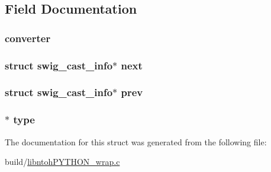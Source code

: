 \subsection{Field Documentation}
\hypertarget{structswig__cast__info_ab0c02ae209c86c1a920b1a6cbec7ec52}{
\subsubsection[{converter}]{ converter}}\label{structswig__cast__info_ab0c02ae209c86c1a920b1a6cbec7ec52}
\hypertarget{structswig__cast__info_af4349454713002040fd3799016337b36}{
\subsubsection[{next}]{\setlength{\rightskip}{0pt plus 5cm}struct {\bf swig\-\_\-cast\-\_\-info}$\ast$ next}}\label{structswig__cast__info_af4349454713002040fd3799016337b36}
\hypertarget{structswig__cast__info_ad21cc20a49152bc851275a6747e89493}{
\subsubsection[{prev}]{\setlength{\rightskip}{0pt plus 5cm}struct {\bf swig\-\_\-cast\-\_\-info}$\ast$ prev}}\label{structswig__cast__info_ad21cc20a49152bc851275a6747e89493}
\hypertarget{structswig__cast__info_aa19bc251346ad9ae4ecb3b4e34545a5d}{
\subsubsection[{type}]{$\ast$ type}}\label{structswig__cast__info_aa19bc251346ad9ae4ecb3b4e34545a5d}


The documentation for this struct was generated from the following file\-:\begin{DoxyCompactItemize}
\item 
build/\hyperlink{libntoh_p_y_t_h_o_n__wrap_8c}{libntoh\-P\-Y\-T\-H\-O\-N\-\_\-wrap.\-c}\end{DoxyCompactItemize}
